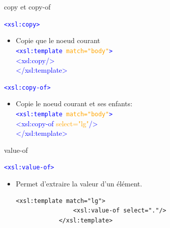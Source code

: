 \begin{frame}{copy et copy-of}
    \begin{block}{\textcolor{blue}{\texttt{<xsl:copy>}}}
    \begin{itemize}
        \item Copie que le noeud courant\\
        \textcolor{blue}{\texttt{<xsl:template \textcolor{orange}{match="body"}>}}\\
        \textcolor{blue}{<xsl:copy/>}\\
        \textcolor{blue}{</xsl:template>}
        
    \end{itemize}
    \end{block}

    \begin{block}{\textcolor{blue}{\texttt{<xsl:copy-of>}}}
        \begin{itemize}
            \item Copie le noeud courant et ses enfants:\\
            \textcolor{blue}{\texttt{<xsl:template \textcolor{orange}{match="body"}>}}\\
        \textcolor{blue}{<xsl:copy-of \textcolor{orange}{select="lg"}/>}\\
        \textcolor{blue}{</xsl:template>}
        \end{itemize}
    \end{block}
\end{frame}

\begin{frame}[fragile]{value-of}
    \begin{block}{\textcolor{blue}{\texttt{<xsl:value-of>}}}
    \begin{itemize}
        \item Permet d'extraire la valeur d'un élément.\\
        \begin{lstlisting}[numbers=none]
            <xsl:template match="lg">
                <xsl:value-of select="."/>
            </xsl:template>
        \end{lstlisting}    
    \end{itemize}
        
    \end{block}
\end{frame}

